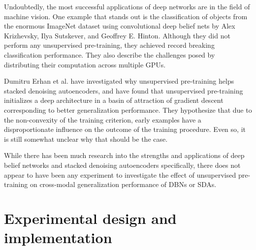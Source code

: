 \documentclass[12pt]{article}
\begin{document}
\begin{doublespacing}
Undoubtedly, the most successful applications of deep networks are in the field of machine vision. One example that stands out is the classification of objects from the enormous ImageNet dataset using convolutional deep belief nets by Alex Krizhevsky, Ilya Sutskever, and Geoffrey E. Hinton\cite{krizhevsky2012imagenet}. Although they did not perform any unsupervised pre-training, they achieved record breaking classification performance. They also describe the challenges posed by distributing their computation across multiple GPUs.

Dumitru Erhan et al. have investigated why unsupervised pre-training helps stacked denoising autoencoders, and have found that unsupervised pre-training initializes a deep architecture in a basin of attraction of gradient descent corresponding to better generalization performance. They hypothesize that due to the non-convexity of the training criterion, early examples have a disproportionate influence on the outcome of the training procedure. Even so, it is still somewhat unclear why that should be the case. \cite{erhan2010does}

While there has been much research into the strengths and applications of deep belief networks and stacked denoising autoencoders specifically, there does not appear to have been any experiment to investigate the effect of unsupervised pre-training on cross-modal generalization performance of DBNs or SDAs.

	
\section{Experimental design and implementation}

\end{doublespacing}
\end{document}
